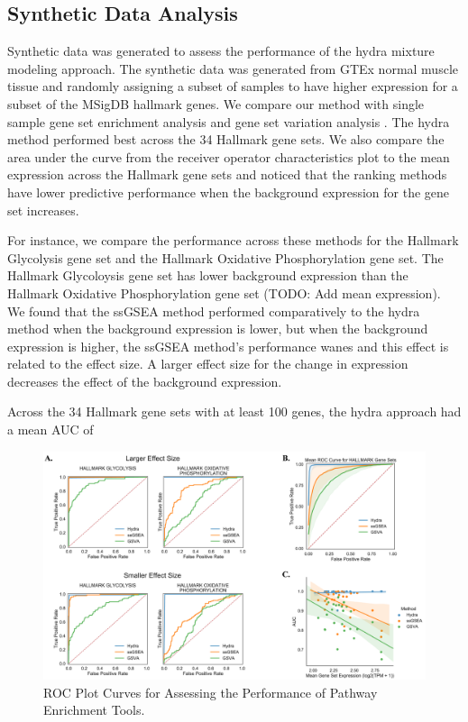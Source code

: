 \documentclass[fleqn,10pt]{wlscirep}
\begin{document}
\subsection*{Synthetic Data Analysis}
Synthetic data was generated to assess the performance of the hydra mixture modeling approach. The synthetic data was generated from GTEx normal muscle tissue and randomly assigning a subset of samples to have higher expression for a subset of the MSigDB hallmark genes. We compare our method with single sample gene set enrichment analysis \cite{barbie2009systematic} and gene set variation analysis \cite{hanzelmann2013gsva}. The hydra method performed best across the 34 Hallmark gene sets. We also compare the area under the curve from the receiver operator characteristics plot to the mean expression across the Hallmark gene sets and noticed that the ranking methods have lower predictive performance when the background expression for the gene set increases.

For instance, we compare the performance across these methods for the Hallmark Glycolysis gene set and the Hallmark Oxidative Phosphorylation gene set. The Hallmark Glycoloysis gene set has lower background expression than the Hallmark Oxidative Phosphorylation gene set (TODO: Add mean expression). We found that the ssGSEA method performed comparatively to the hydra method when the background expression is lower, but when the background expression is higher, the ssGSEA method's performance wanes and this effect is related to the effect size. A larger effect size for the change in expression decreases the effect of the background expression.

Across the 34 Hallmark gene sets with at least 100 genes, the hydra approach had a mean AUC of 


\begin{figure}
	\centering
	\includegraphics[width=0.75\linewidth]{images/figure-2-roc-curves@2x.png}
	\caption{ROC Plot Curves for Assessing the Performance of Pathway Enrichment Tools.}
	\label{sfig:rocplot}
\end{figure}
\end{document}
